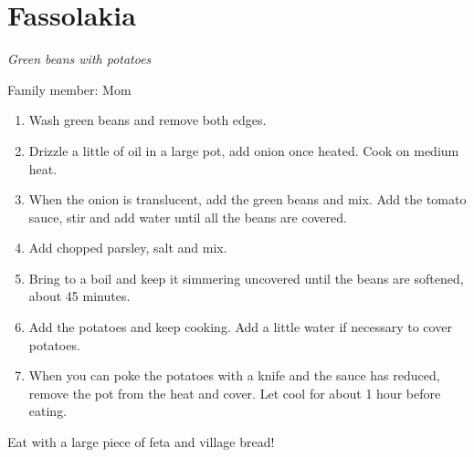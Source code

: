 \chapter{Fassolakia}
\label{ch:fassolakia}


\textit{Green beans with potatoes}

Family member: Mom



\begin{enumerate}
    \item Wash green beans and remove both edges.
    \item Drizzle a little of oil in a large pot, add onion once heated. Cook on medium heat.
    \item When the onion is translucent, add the green beans and mix. Add the tomato sauce, stir and add water until all the beans are covered.
    \item Add chopped parsley, salt and mix.
    \item Bring to a boil and keep it simmering uncovered until the beans are softened, about 45 minutes.
    \item Add the potatoes and keep cooking. Add a little water if necessary to cover potatoes.
    \item When you can poke the potatoes with a knife and the sauce has reduced, remove the pot from the heat and cover. Let cool for about 1 hour before eating.
\end{enumerate}

Eat with a large piece of feta and village bread!

